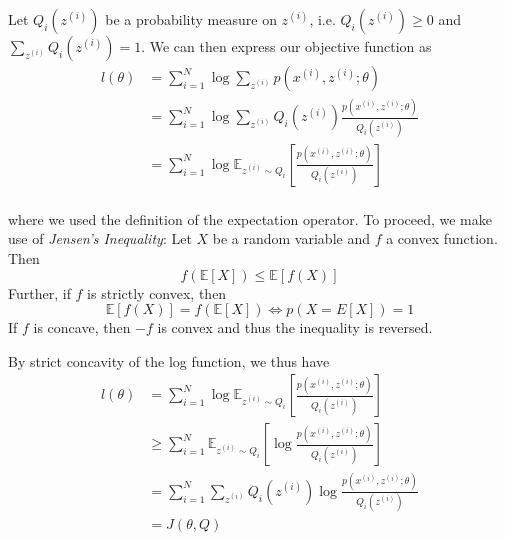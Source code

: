 \documentclass[final,3p,times,twocolumn]{elsarticle}
\begin{document}
Let $Q_i(z^{(i)})$ be a probability measure on $z^{(i)}$, i.e. $Q_i(z^{(i)}) \geq 0$ and $\sum_{z^{(i)}} Q_i(z^{(i)}) = 1$. We can then express our objective function as
\begin{equation}
\begin{split}
l(\theta) &= \sum_{i=1}^N \log \sum_{z^{(i)}} p(x^{(i)},z^{(i)};\theta)\\
&= \sum_{i=1}^N \log \sum_{z^{(i)}} Q_i(z^{(i)}) \frac{p(x^{(i)},z^{(i)};\theta)}{Q_i(z^{(i)})}\\
&= \sum_{i=1}^N \log \mathbb{E}_{z^{(i)} \sim Q_i}\left[\frac{p(x^{(i)},z^{(i)};\theta)}{Q_i(z^{(i)})}\right]\\
\end{split}
\end{equation}

where we used the definition of the expectation operator. To proceed, we make use of \emph{Jensen's Inequality}: Let $X$ be a random variable and $f$ a convex function. Then
\begin{equation}
f(\mathbb{E}[X]) \leq \mathbb{E}[f(X)]
\label{eqn:jensen}
\end{equation}
Further, if $f$ is strictly convex, then 
\begin{equation}
\mathbb{E}[f(X)] = f(\mathbb{E}[X]) \iff p(X = E[X]) = 1
\label{eqn:jensentight}
\end{equation}
If $f$ is concave, then $-f$ is convex and thus the inequality is reversed.

By strict concavity of the log function, we thus have
\begin{equation}
\begin{split}
l(\theta) &=  \sum_{i=1}^N \log \mathbb{E}_{z^{(i)} \sim Q_i}\left[\frac{p(x^{(i)},z^{(i)};\theta)}{Q_i(z^{(i)})}\right]\\
&\geq \sum_{i=1}^N \mathbb{E}_{z^{(i)} \sim Q_i}\left[\log \frac{p(x^{(i)},z^{(i)};\theta)}{Q_i(z^{(i)})}\right]\\ 
&= \sum_{i=1}^N \sum_{z^{(i)}} Q_i(z^{(i)}) \log \frac{p(x^{(i)},z^{(i)};\theta)}{Q_i(z^{(i)})}\\ 
&= J(\theta,Q)
\end{split}
\end{equation}
\end{document}
